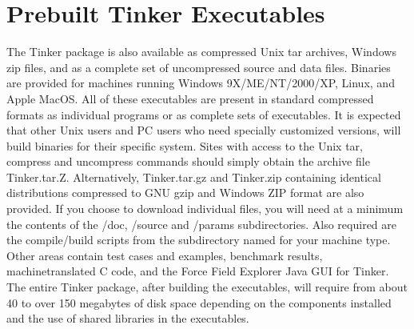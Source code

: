 \documentclass[letterpaper,11pt,english]{sphinxmanual}
\begin{document}
\section{Prebuilt Tinker Executables}
\label{\detokenize{text/installation:prebuilt-tinker-executables}}
The Tinker package is also available as compressed Unix tar archives, Windows zip files, and as a complete set of uncompressed source and data files. Binaries are provided for machines running Windows 9X/ME/NT/2000/XP, Linux, and Apple MacOS. All of these executables are present in standard compressed formats as individual programs or as complete sets of executables. It is expected that other Unix users and PC users who need specially customized versions, will build binaries for their specific system. Sites with access to the Unix tar, compress and uncompress commands should simply obtain the archive file Tinker.tar.Z. Alternatively, Tinker.tar.gz and Tinker.zip containing identical distributions compressed to GNU gzip and Windows ZIP format are also provided. If you choose to download individual files, you will need at a minimum the contents of the /doc, /source and /params subdirectories. Also required are the compile/build scripts from the subdirectory named for your machine type. Other areas contain test cases and examples, benchmark results, machine\sphinxhyphen{}translated C code, and the Force Field Explorer Java GUI for Tinker. The entire Tinker package, after building the executables, will require from about 40 to over 150 megabytes of disk space depending on the components installed and the use of shared libraries in the executables.
\end{document}
